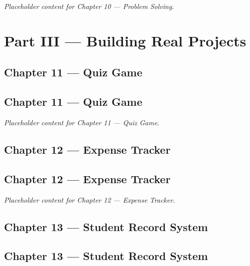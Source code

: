 \documentclass[
  letterpaper,
  DIV=11,
  numbers=noendperiod]{scrreprt}
\begin{document}

\emph{Placeholder content for Chapter 10 --- Problem Solving.}

\part{Part III --- Building Real Projects}

\chapter{Chapter 11 --- Quiz Game}\label{chapter-11-quiz-game}

\chapter*{Chapter 11 --- Quiz Game}\label{chapter-11-quiz-game-1}


\emph{Placeholder content for Chapter 11 --- Quiz Game.}

\chapter{Chapter 12 --- Expense
Tracker}\label{chapter-12-expense-tracker}

\chapter*{Chapter 12 --- Expense
Tracker}\label{chapter-12-expense-tracker-1}


\emph{Placeholder content for Chapter 12 --- Expense Tracker.}

\chapter{Chapter 13 --- Student Record
System}\label{chapter-13-student-record-system}

\chapter*{Chapter 13 --- Student Record
System}\label{chapter-13-student-record-system-1}
\end{document}
